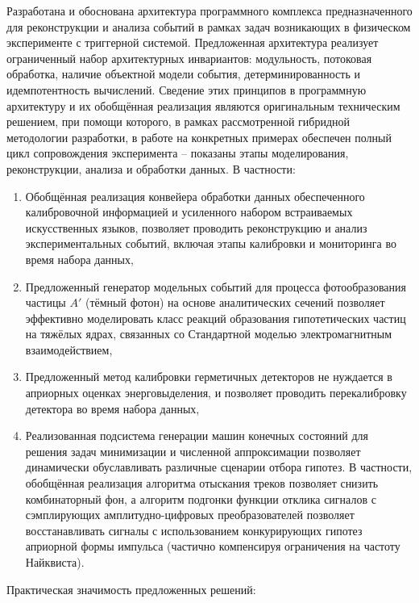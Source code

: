 Разработана и обоснована архитектура программного комплекса
предназначенного для реконструкции и анализа событий в
рамках задач возникающих в физическом эксперименте с триггерной
системой.
Предложенная архитектура реализует ограниченный набор
архитектурных инвариантов:
модульность,
потоковая обработка,
наличие объектной модели события,
детерминированность и идемпотентность вычислений.
Сведение этих принципов в программную архитектуру и их
обобщённая реализация являются оригинальным техническим
решением, при помощи которого, в рамках рассмотренной гибридной методологии
разработки, в работе на конкретных
примерах обеспечен полный цикл сопровождения эксперимента -- показаны этапы
моделирования, реконструкции, анализа и обработки данных. В частности:
\begin{enumerate}
    \item Обобщённая реализация конвейера обработки данных обеспеченного
    калибровочной информацией и усиленного набором встраиваемых
    искусственных языков, позволяет проводить реконструкцию
    и анализ экспериментальных событий, включая этапы калибровки и
    мониторинга во время набора данных,
    \item Предложенный генератор модельных событий для процесса
    фотообразования частицы $A'$ (тёмный фотон) на основе аналитических
    сечений позволяет эффективно моделировать
    класс реакций образования гипотетических частиц на тяжёлых ядрах,
    связанных со Стандартной моделью электромагнитным взаимодействием,
    \item Предложенный метод калибровки герметичных детекторов не
    нуждается в априорных оценках энерговыделения, и позволяет проводить
    перекалибровку детектора во время набора данных,
    \item Реализованная подсистема генерации машин конечных состояний для
    решения задач минимизации и численной аппроксимации позволяет динамически
    обуславливать различные сценарии отбора гипотез. В частности, обобщённая
    реализация алгоритма отыскания треков позволяет снизить комбинаторный фон,
    а алгоритм подгонки функции отклика сигналов с сэмплирующих
    амплитудно-цифровых преобразователей позволяет восстанавливать сигналы
    с использованием конкурирующих гипотез априорной формы
    импульса (частично компенсируя ограничения на частоту Найквиста).
\end{enumerate}

Практическая значимость предложенных решений:


